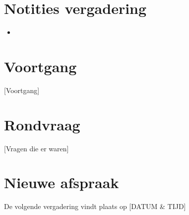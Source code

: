 \documentclass[dutch]{hu}
\begin{document}
\section{Notities vergadering}
\begin{itemize}

\item 

\end{itemize}

\section{Voortgang}
[Voortgang]

\section{Rondvraag}
[Vragen die er waren]

\section{Nieuwe afspraak}
De volgende vergadering vindt plaats op [DATUM & TIJD]
\end{document}
